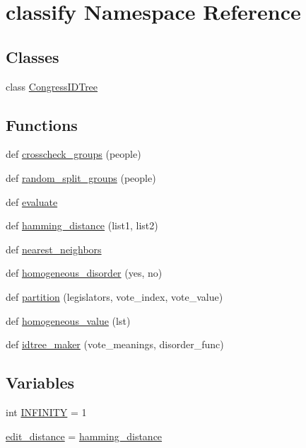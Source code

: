 \hypertarget{namespaceclassify}{}\section{classify Namespace Reference}
\label{namespaceclassify}
\subsection*{Classes}
\begin{DoxyCompactItemize}
\item 
class \hyperlink{classclassify_1_1_congress_i_d_tree}{Congress\+I\+D\+Tree}
\end{DoxyCompactItemize}
\subsection*{Functions}
\begin{DoxyCompactItemize}
\item 
def \hyperlink{namespaceclassify_ad3d37310e4719022d61524cf3f147bf8}{crosscheck\+\_\+groups} (people)
\item 
def \hyperlink{namespaceclassify_a843fabcbe0967109eb8d9dd1bc86ab11}{random\+\_\+split\+\_\+groups} (people)
\item 
def \hyperlink{namespaceclassify_a54e0f202c3873fb6293abb16a348b873}{evaluate}
\item 
def \hyperlink{namespaceclassify_a53feccc4cce4688adaea63dd77df6ad4}{hamming\+\_\+distance} (list1, list2)
\item 
def \hyperlink{namespaceclassify_a38d3402082141a678096dddcb5d6fd02}{nearest\+\_\+neighbors}
\item 
def \hyperlink{namespaceclassify_a479758ad5c9afb7c177bfce091fb5d67}{homogeneous\+\_\+disorder} (yes, no)
\item 
def \hyperlink{namespaceclassify_a29c5592fe08bd6db1c69ffeedc10e764}{partition} (legislators, vote\+\_\+index, vote\+\_\+value)
\item 
def \hyperlink{namespaceclassify_aaaeafd0c793635d8e63598e8d42e2fde}{homogeneous\+\_\+value} (lst)
\item 
def \hyperlink{namespaceclassify_ae8f78a6b644ef73e187aedd781af07a7}{idtree\+\_\+maker} (vote\+\_\+meanings, disorder\+\_\+func)
\end{DoxyCompactItemize}
\subsection*{Variables}
\begin{DoxyCompactItemize}
\item 
int \hyperlink{namespaceclassify_a065cd3de81830bc79376bb6be8b41487}{I\+N\+F\+I\+N\+I\+T\+Y} = 1
\item 
\hyperlink{namespaceclassify_a5dd83ee698e3862948092cc5a3d4f735}{edit\+\_\+distance} = \hyperlink{namespaceclassify_a53feccc4cce4688adaea63dd77df6ad4}{hamming\+\_\+distance}
\end{DoxyCompactItemize}


